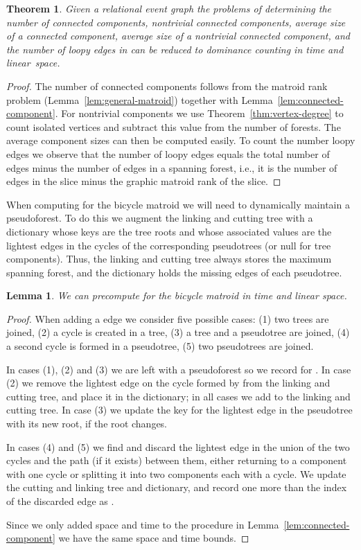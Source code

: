 \documentclass[11pt]{article}
\newtheorem{lemma}{Lemma}
\newtheorem{theorem}{Theorem}
\begin{document}
\begin{theorem}\label{thm:connected-component}
Given a relational event graph  the problems of determining the number of connected components, nontrivial connected components, average size of a connected component,  average size of a nontrivial connected component, and the number of loopy edges in  can be reduced to dominance counting in  time and linear~space.
\end{theorem}

\begin{proof}
The number of connected components follows from the matroid rank problem (Lemma~\ref{lem:general-matroid}) together with Lemma~\ref{lem:connected-component}. For nontrivial components we use Theorem~\ref{thm:vertex-degree} to count isolated vertices and subtract this value from the number of forests. The average component sizes can then be computed easily. To count the number loopy edges we observe that the number of loopy edges equals the total number of edges minus the number of edges in a spanning forest, i.e., it is the number of edges in the slice minus the graphic matroid rank of the slice.
\end{proof}

When computing  for the bicycle matroid we will need to dynamically maintain a pseudoforest. To do this we augment the linking and cutting tree with a dictionary whose keys are the tree roots and whose associated values are the lightest edges in the cycles of the corresponding pseudotrees (or null for tree components). Thus, the linking and cutting tree always stores the maximum spanning forest, and the dictionary holds the missing edges of each pseudotree.

\begin{lemma}\label{lem:loopy-component}
We can precompute  for the bicycle matroid in  time and linear space.
\end{lemma}
\begin{proof}
When adding a edge  we consider five possible cases: (1) two trees are joined, (2) a cycle is created in a tree,  (3) a tree and a pseudotree are joined, (4) a second cycle is formed in a pseudotree, (5) two pseudotrees are joined.

In cases (1), (2) and (3) we are left with a pseudoforest so we record  for . In case (2) we remove the lightest edge on the cycle formed by  from the linking and cutting tree, and place it in the dictionary; in all cases we add  to the linking and cutting tree. In case (3) we update the key for the lightest edge in the pseudotree with its new root, if the root changes.

In cases (4) and (5) we find and discard the lightest edge in the union of the two cycles and the path (if it exists) between them, 
either returning to a component with one cycle or splitting it into two components each with a cycle. We update the cutting and linking tree and dictionary, and record one more than the index of the discarded edge as .

Since we only added  space and  time to the procedure in Lemma~\ref{lem:connected-component} we have the same space and time bounds.
\end{proof}
\end{document}
